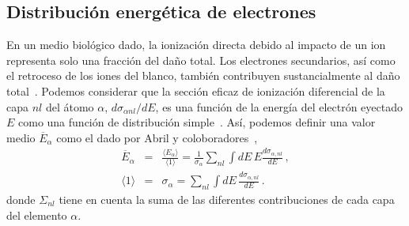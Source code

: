 \subsection{Distribución energética de electrones}
\label{subsec:meanener}

En un medio biológico dado, la ionización directa debido al impacto de
un ion representa solo una fracción del daño total. Los electrones
secundarios, así como el retroceso de los iones del blanco, también
contribuyen sustancialmente al daño total~\cite{Denifl2011}. 
Podemos considerar que la sección eficaz de ionización diferencial de la
capa $nl$ del átomo $\alpha$, $d\sigma_{\alpha nl}/dE$, es una función 
de la energía del electrón eyectado $E$ como una función de distribución
simple~\cite{surdutovic2018}. Así, podemos definir una valor medio 
$\overline{E}_{\alpha}$ como el dado por Abril y 
coloboradores~\cite{abril2015},
\begin{eqnarray}
\overline{E}_{\alpha} &=&\frac{\langle E_{\alpha}\rangle}{\langle
1\rangle}=\frac{1}{\sigma_{\alpha}}\sum\limits_{nl}\int dE\,E
\frac{d\sigma_{\alpha,nl}}{dE}\,,  
\label{40} \\
\langle 1\rangle &=&\sigma_{\alpha}=\sum\limits_{nl}\int dE\,
\frac{d\sigma_{\alpha,nl}}{dE}\,. 
\label{50}
\end{eqnarray}
donde $\Sigma_{nl}$ tiene en cuenta la suma de las diferentes 
contribuciones de cada capa del elemento $\alpha$.

